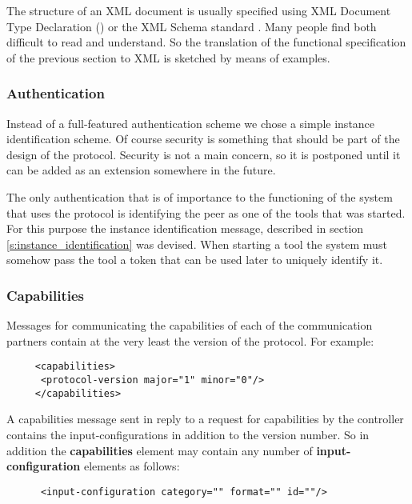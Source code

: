 \documentclass{article}
\begin{document}
   The structure of an XML document is usually specified using XML Document
   Type Declaration (\cite{Sperberg-McQueen:06:EML}) or the XML Schema standard
   \cite{Malhotra:06:XSP}. Many people find both difficult to read and understand.
   So the translation of the functional specification of the previous section to
   XML is sketched by means of examples.

  \subsubsection{Authentication}

   Instead of a full-featured authentication scheme we chose a simple instance
   identification scheme. Of course security is something that should be part
   of the design of the protocol. Security is not a main concern, so it is
   postponed until it can be added as an extension somewhere in the future.
   
   The only authentication that is of importance to the functioning of the
   system that uses the protocol is identifying the peer as one of the tools
   that was started. For this purpose the instance identification message,
   described in section \ref{s:instance_identification} was devised. When
   starting a tool the system must somehow pass the tool a token that can be
   used later to uniquely identify it.

  \subsubsection{Capabilities}

   Messages for communicating the capabilities of each of the communication
   partners contain at the very least the version of the protocol. For example:

    \begin{verbatim}
     <capabilities>
      <protocol-version major="1" minor="0"/>
     </capabilities>\end{verbatim}

   A capabilities message sent in reply to a request for capabilities by the
   controller contains the input-configurations in addition to the version
   number. So in addition the \textbf{capabilities} element may contain any
   number of \textbf{input-configuration} elements as follows:

    \begin{verbatim}
      <input-configuration category="" format="" id=""/>\end{verbatim}
\end{document}
